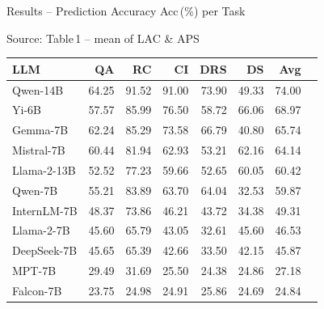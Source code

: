 \documentclass{beamer}
\newcommand{\hrow}{\rowcolor{hlblue}}
\begin{document}
\begin{frame}{Results -- Prediction Accuracy Acc\,(\%) per Task}

\begin{block}{\scriptsize Source: Table\,1 -- mean of LAC \& APS}
\scriptsize
\renewcommand{\arraystretch}{1.12}
\begin{center}
\begin{tabular}{lrrrrrrr}
\toprule
\textbf{LLM} & \textbf{QA} & \textbf{RC} & \textbf{CI} & \textbf{DRS} & \textbf{DS} & \textbf{Avg} \\
\midrule
\hrow Qwen-14B   & 64.25 & 91.52 & 91.00 & 73.90 & 49.33 & 74.00 \\
Yi-6B            & 57.57 & 85.99 & 76.50 & 58.72 & 66.06 & 68.97 \\
Gemma-7B         & 62.24 & 85.29 & 73.58 & 66.79 & 40.80 & 65.74 \\
Mistral-7B       & 60.44 & 81.94 & 62.93 & 53.21 & 62.16 & 64.14 \\
Llama-2-13B      & 52.52 & 77.23 & 59.66 & 52.65 & 60.05 & 60.42 \\
Qwen-7B          & 55.21 & 83.89 & 63.70 & 64.04 & 32.53 & 59.87 \\
InternLM-7B      & 48.37 & 73.86 & 46.21 & 43.72 & 34.38 & 49.31 \\
Llama-2-7B       & 45.60 & 65.79 & 43.05 & 32.61 & 45.60 & 46.53 \\
DeepSeek-7B      & 45.65 & 65.39 & 42.66 & 33.50 & 42.15 & 45.87 \\
MPT-7B           & 29.49 & 31.69 & 25.50 & 24.38 & 24.86 & 27.18 \\
Falcon-7B        & 23.75 & 24.98 & 24.91 & 25.86 & 24.69 & 24.84 \\
\bottomrule
\end{tabular}
\end{center}
\end{block}

\end{frame}
\end{document}
